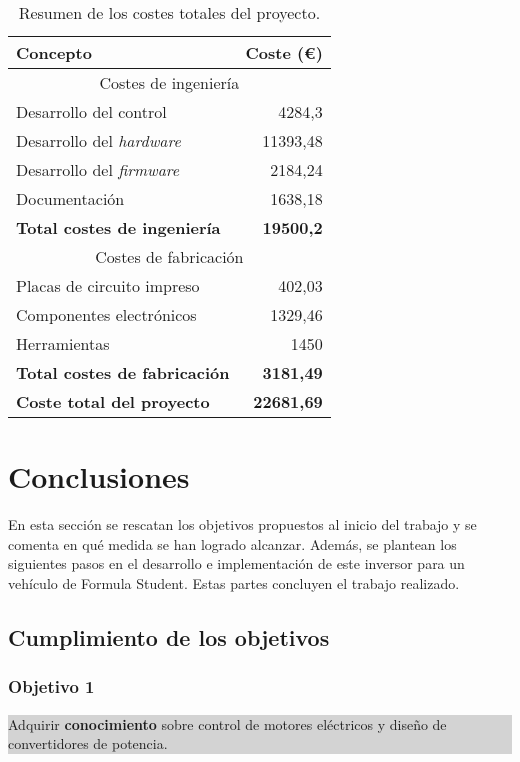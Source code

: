 \begin{table}[H]
	\centering
	\begin{tabular}{|l|r|}
		\hline
		\textbf{Concepto} & \textbf{Coste (\euro{})} \\
		\hline
		\multicolumn{2}{|c|}{Costes de ingeniería} \\
		\hline
		Desarrollo del control & 4284,3 \\
		Desarrollo del \textit{hardware} & 11393,48 \\
		Desarrollo del \textit{firmware} & 2184,24 \\
		Documentación & 1638,18 \\
		\hline
		\textbf{Total costes de ingeniería} & \textbf{19500,2} \\
		\hline
		\multicolumn{2}{|c|}{Costes de fabricación} \\
		\hline
		Placas de circuito impreso & 402,03 \\
		Componentes electrónicos & 1329,46 \\
		Herramientas & 1450 \\
		\hline
		\textbf{Total costes de fabricación} & \textbf{3181,49} \\
		\hline
		\textbf{Coste total del proyecto} & \textbf{22681,69} \\
		\hline
	\end{tabular}
	\caption{Resumen de los costes totales del proyecto.}
\end{table}


\newpage
\section{Conclusiones}

En esta sección se rescatan los objetivos propuestos al inicio del trabajo y se comenta en qué medida se han logrado alcanzar. Además, se plantean los siguientes pasos en el desarrollo e implementación de este inversor para un vehículo de Formula Student. Estas partes concluyen el trabajo realizado.

\subsection{Cumplimiento de los objetivos}

\subsubsection*{Objetivo 1}
\colorbox{lightgray}{%
	\parbox{\dimexpr\linewidth-2\fboxsep-2\fboxrule}{%
		Adquirir \textbf{conocimiento} sobre control de motores eléctricos y diseño de convertidores de potencia.%
	}%
}

